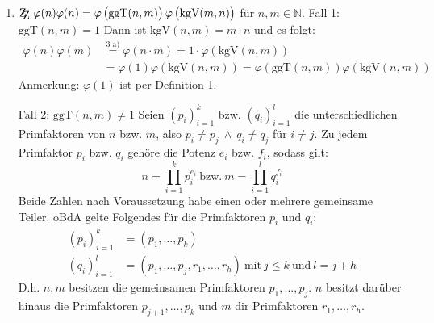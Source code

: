 \documentclass[DIN, pagenumber=false, fontsize=11pt, parskip=half]{scrartcl}
\newcommand{\N}[0]{\mathbb{N}}
\newcommand{\ZZ}{\mathrm{Z\kern-.3em\raise-0.5ex\hbox{Z}}}
\newcommand{\ggt}{\text{ggT}}
\newcommand{\kgv}{\text{kgV}}
\begin{document}
\begin{enumerate}[label=\alph*)]
        \newpage

        \item $\ZZ \ \varphi(n) \varphi(n) = \varphi\left(\ggt(n, m)\right) \varphi\left(\kgv(m, n)\right)$ für $n, m \in \N$. \newline
        Fall 1: $\ggt(n, m) = 1$ \newline
        Dann ist $\kgv(n, m) = m \cdot n$ und es folgt:
        \begin{align*}
            \varphi(n) \varphi(m) &\stackrel{\text{3 a)}}{=} \varphi(n \cdot m) = 1 \cdot \varphi\left(\kgv(n, m)\right) \\
            &= \varphi(1) \varphi\left(\kgv(n, m)\right) = \varphi(\ggt(n, m)) \varphi\left(\kgv(n, m)\right)
        \end{align*}
        Anmerkung: $\varphi(1)$ ist per Definition 1.


        Fall 2: $\ggt(n, m) \neq 1$ \newline
        Seien $(p_i)_{i=1}^k$ bzw. $(q_i)_{i=1}^l$ die unterschiedlichen Primfaktoren von $n$ bzw. $m$, also $p_i \neq p_j \ \wedge \ q_i \neq q_j$ für 
        $i \neq j$. Zu jedem Primfaktor $p_i$ bzw. $q_i$ gehöre die Potenz $e_i$ bzw. $f_i$, sodass gilt:
        \begin{equation}
            n = \prod_{i=1}^k{p_i^{e_i}} \ \text{bzw.} \ m = \prod_{i=1}^l{q_i^{f_i}} \label{eq:pfz}
        \end{equation}
        Beide Zahlen nach Voraussetzung habe einen oder mehrere gemeinsame Teiler. oBdA gelte Folgendes für die Primfaktoren $p_i$ und $q_i$:
        \begin{align}
            (p_i)_{i=1}^k &= (p_1, \dots, p_k) \label{eq:nPrime}\\
            (q_i)_{i=1}^l &= (p_1, \dots, p_j, r_1, \dots, r_h) \ \text{mit} \ j \leq k \ \text{und} \ l = j+h \label{eq:mPrime}
        \end{align}
        D.h. $n, m$ besitzen die gemeinsamen Primfaktoren $p_1, \dots, p_j$. $n$ besitzt darüber hinaus die Primfaktoren $ p_{j+1}, \dots, p_k$ und $m$
        dir Primfaktoren $r_1, \dots, r_h$.


\end{enumerate}
\end{document}
